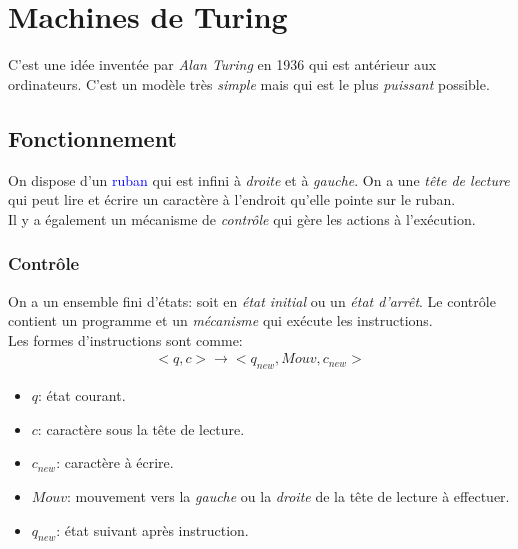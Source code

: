 \documentclass{report}
\begin{document}
\section{Machines de Turing}
C'est une idée inventée par \textit{Alan Turing} en 1936 qui est antérieur aux ordinateurs. C'est un modèle très \textit{simple} mais qui est le plus \textit{puissant} possible.

\subsection{Fonctionnement}
On dispose d'un \textcolor{blue}{ruban} qui est infini à \textit{droite} et à \textit{gauche}. On a une \textit{tête de lecture} qui peut lire et écrire un caractère à l'endroit qu'elle pointe sur le ruban.\\
Il y a également un mécanisme de \textit{contrôle} qui gère les actions à l'exécution.

\subsubsection{Contrôle}
On a un ensemble fini d'états: soit en \textit{état initial} ou un \textit{état d'arrêt}. Le contrôle contient un programme et un \textit{mécanisme} qui exécute les instructions.\\
Les formes d'instructions sont comme:
\begin{align*}
<q, c> \rightarrow <q_{new}, Mouv, c_{new}>
\end{align*}
\begin{itemize}
\item $q$: état courant.
\item $c$: caractère sous la tête de lecture.
\item $c_{new}$: caractère à écrire.
\item $Mouv$: mouvement vers la \textit{gauche} ou la \textit{droite} de la tête de lecture à effectuer.
\item $q_{new}$: état suivant après instruction.
\end{itemize}
\end{document}
